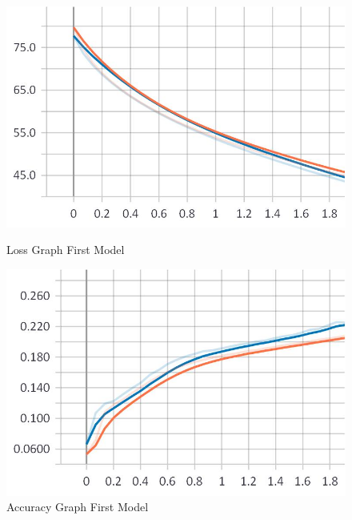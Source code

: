 \begin{figure}
\centering
\begin{minipage}{.5\textwidth}
	\centering
	\includegraphics[width=1\linewidth]{Illustrations/losss2.jpg}
	\caption{Loss Graph First Model}
	\label{fig:loss2}
\end{minipage}%
\begin{minipage}{.5\textwidth}
	\centering
	\includegraphics[width=1\linewidth]{Illustrations/accuracy2.jpg}
	\caption{Accuracy Graph First Model}
	\label{fig:accuracy2}
\end{minipage}
\end{figure}

